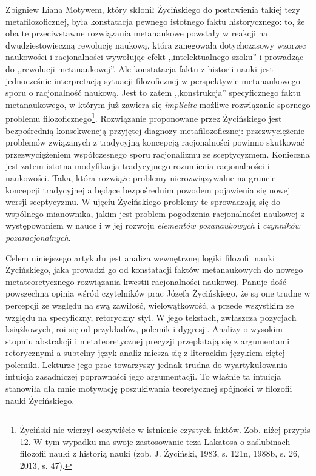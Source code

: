 \begin{artplenv}{Zbigniew Liana}
Motywem, który skłonił Życińskiego do postawienia takiej tezy metafilozoficznej, była konstatacja pewnego istotnego
faktu historycznego: to, że oba te przeciwstawne rozwiązania metanaukowe powstały w reakcji na dwudziestowieczną
rewolucję naukową, która zanegowała dotychczasowy wzorzec naukowości i racjonalności wywołując efekt ,,intelektualnego
szoku'' i prowadząc do ,,rewolucji metanaukowej''. Ale konstatacja faktu z historii nauki jest jednocześnie interpretacją
sytuacji filozoficznej w perspektywie metanaukowego sporu o racjonalność naukową. Jest to zatem ,,konstrukcja''
specyficznego faktu metanaukowego, w którym już zawiera się \textit{implicite} możliwe rozwiązanie spornego problemu
filozoficznego\footnote{Życiński nie wierzył oczywiście w istnienie czystych faktów. Zob. niżej przypis 12. W tym
wypadku ma swoje zastosowanie teza Lakatosa o zaślubinach filozofii nauki z historią nauki
\label{ref:RNDS7T4vadlBl}(zob. J. Życiński, 1983, s. 121n, 1988b, s. 26, 2013, s. 47).}. Rozwiązanie proponowane przez
Życińskiego jest bezpośrednią konsekwencją przyjętej diagnozy metafilozoficznej: przezwyciężenie problemów związanych z tradycyjną
koncepcją racjonalności powinno skutkować przezwyciężeniem współczesnego sporu racjonalizmu ze sceptycyzmem.
Konieczna jest zatem istotna modyfikacja tradycyjnego rozumienia racjonalności i naukowości. Taka, która rozwiąże
problemy nierozwiązywalne na gruncie koncepcji tradycyjnej a będące bezpośrednim powodem pojawienia się nowej wersji
sceptycyzmu. W ujęciu Życińskiego problemy te sprowadzają się do wspólnego mianownika, jakim jest problem pogodzenia
racjonalności naukowej z występowaniem w nauce i w jej rozwoju \textit{elementów pozanaukowych} i \textit{czynników
pozaracjonalnych}.

Celem niniejszego artykułu jest analiza wewnętrznej logiki filozofii nauki Życińskiego, jaka prowadzi go od konstatacji
faktów metanaukowych do nowego metateoretycznego rozwiązania kwestii racjonalności naukowej. Panuje dość powszechna
opinia wśród czytelników prac Józefa Życińskiego, że są one trudne w percepcji ze względu na swą zawiłość,
wielowątkowość, a przede wszystkim ze względu na specyficzny, retoryczny styl. W jego tekstach, zwłaszcza pozycjach
książkowych, roi się od przykładów, polemik i dygresji. Analizy o wysokim stopniu abstrakcji i metateoretycznej
precyzji przeplatają się z argumentami retorycznymi a subtelny język analiz miesza się z literackim językiem ciętej
polemiki. Lekturze jego prac towarzyszy jednak trudna do wyartykułowania intuicja zasadniczej poprawności jego
argumentacji. To właśnie ta intuicja stanowiła dla mnie motywację poszukiwania teoretycznej spójności w filozofii nauki
Życińskiego.


\end{artplenv}
